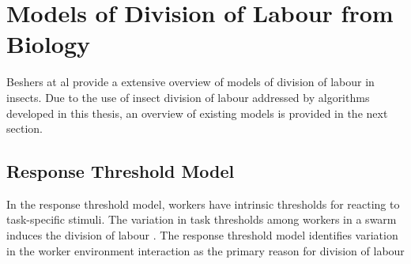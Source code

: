 


\section{Models of Division of Labour from Biology}

Beshers at al \cite{beshers2001models} provide a extensive overview of models of division of labour in insects. Due to the use of insect division of labour addressed by algorithms developed in this thesis, an overview of existing models is provided in the next section.

\subsection{Response Threshold Model}

In the response threshold model, workers have intrinsic thresholds for reacting to task-specific stimuli. The variation in task thresholds among workers in a swarm induces the division of labour \cite{robinson1992regulation}. The response threshold model identifies variation in the worker environment interaction as the primary reason for division of labour

